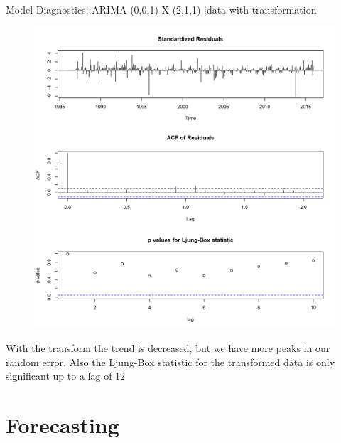 \documentclass[xcolor=dvipsnames]{beamer}
\begin{document}
\begin{frame}{Model Diagnostics: ARIMA (0,0,1) X (2,1,1) [data with transformation]}
\begin{figure}
\centering\includegraphics[width=.45\linewidth]{../normalplots/tsdiag-fitLV-plot.png}
\end{figure}

\vfill 
\footnotesize With the transform the trend is decreased, but we have more peaks in our random error. Also the Ljung-Box statistic for the transformed data is only significant up to a lag of 12 
\end{frame}

\section{Forecasting}
\subsection{}
\end{document}
